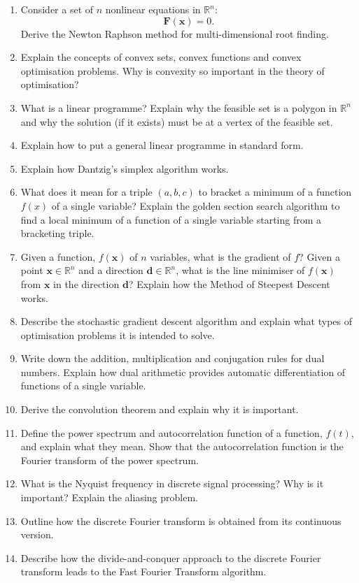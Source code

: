 \documentclass[11pt]{article}
\newcommand*{\xv}{\mathbf{x}}
\newcommand*{\dv}{\mathbf{d}}
\begin{document}
\begin{multicols}{2}
\begin{enumerate}
\item
Consider a set of $n$ nonlinear equations in $\mathbb{R}^n$:
\begin{displaymath}
\mathbf{F}(\xv) = 0.
\end{displaymath}
Derive the Newton Raphson method for multi-dimensional root finding. 
\item 
Explain the concepts of convex sets, convex functions and convex optimisation problems. Why is convexity so important in the theory of optimisation?
\item
What is a linear programme? Explain why the feasible set is a polygon in $\mathbb{R}^n$ and why the solution (if it exists) must be at a vertex of the feasible set.
\item
Explain how to put a general linear programme in standard form.
\item
Explain how Dantzig's simplex algorithm works.
\item
What does it mean for a triple $(a, b, c)$ to bracket a minimum of a function $f(x)$ of a single variable? Explain the golden section search algorithm to find a local minimum of a function of a single variable starting from a bracketing triple.
\item
Given a function, $f(\xv)$ of $n$ variables, what is the gradient of $f$? Given a point $\xv \in \mathbb{R}^n$ and a direction $\dv \in \mathbb{R}^n$, what is the line minimiser of $f(\xv)$ from $\xv$ in the direction $\dv$? Explain how the Method of Steepest Descent works.
\item
Describe the stochastic gradient descent algorithm and explain what types of optimisation problems it is intended to solve.
\item
Write down the addition, multiplication and conjugation rules for dual numbers. Explain how dual arithmetic provides automatic differentiation of functions of a single variable. 
\item
Derive the convolution theorem and explain why it is important.
\item
Define the power spectrum and autocorrelation function of a function, $f(t)$, and explain what they mean. Show that the autocorrelation function is the Fourier transform of the power spectrum.
\item
What is the Nyquist frequency in discrete signal processing? Why is it important? Explain the aliasing problem.
\item
Outline how the discrete Fourier transform is obtained from its continuous version.
\item
Describe how the divide-and-conquer approach to the discrete Fourier transform leads to the Fast Fourier Transform algorithm.
\end{enumerate}

\end{multicols}
\end{document}
